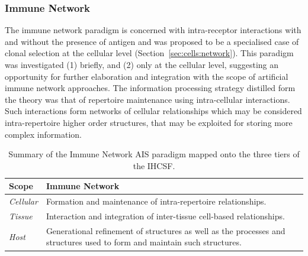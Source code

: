 \subsubsection{Immune Network}
The immune network paradigm is concerned with intra-receptor interactions with and without the presence of antigen and was proposed to be a specialised case of clonal selection at the cellular level (Section~\ref{sec:cells:network}). This paradigm was investigated (1) briefly, and (2) only at the cellular level, suggesting an opportunity for further elaboration and integration with the scope of artificial immune network approaches.
The information processing strategy distilled form the theory was that of repertoire maintenance using intra-cellular interactions. Such interactions form networks of cellular relationships which may be considered intra-repertoire higher order structures, that may be exploited for storing more complex information.

\begin{table}[htp]
	\centering\small
		\begin{tabularx}{\textwidth}{lX}
		\toprule
		\textbf{Scope} & \textbf{Immune Network} \\ 
		\toprule
		\emph{Cellular} & Formation and maintenance of intra-repertoire relationships. \\ 
		\midrule
		\emph{Tissue} & Interaction and integration of inter-tissue cell-based relationships. \\ 
		\midrule
		\emph{Host} & Generational refinement of structures as well as the processes and structures used to form and maintain such structures. \\ 
		\bottomrule
		\end{tabularx}
	\caption{Summary of the Immune Network AIS paradigm mapped onto the three tiers of the IHCSF.}
	\label{tab:framework:ais:immunenetwork}
\end{table}

